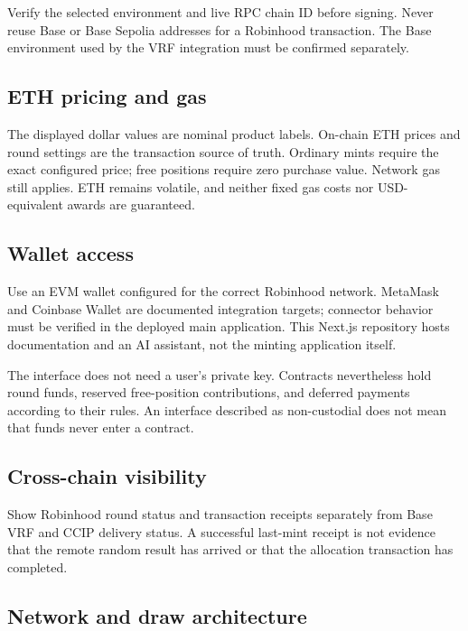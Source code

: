 \documentclass[
  10pt,
  letterpaper,
]{article}
\begin{document}
Verify the selected environment and live RPC chain ID before signing.
Never reuse Base or Base Sepolia addresses for a Robinhood transaction.
The Base environment used by the VRF integration must be confirmed
separately.

\subsection{ETH pricing and gas}\label{eth-pricing-and-gas}

The displayed dollar values are nominal product labels. On-chain ETH
prices and round settings are the transaction source of truth. Ordinary
mints require the exact configured price; free positions require zero
purchase value. Network gas still applies. ETH remains volatile, and
neither fixed gas costs nor USD-equivalent awards are guaranteed.

\subsection{Wallet access}\label{wallet-access}

Use an EVM wallet configured for the correct Robinhood network. MetaMask
and Coinbase Wallet are documented integration targets; connector
behavior must be verified in the deployed main application. This Next.js
repository hosts documentation and an AI assistant, not the minting
application itself.

The interface does not need a user's private key. Contracts nevertheless
hold round funds, reserved free-position contributions, and deferred
payments according to their rules. An interface described as
non-custodial does not mean that funds never enter a contract.

\subsection{Cross-chain visibility}\label{cross-chain-visibility}

Show Robinhood round status and transaction receipts separately from
Base VRF and CCIP delivery status. A successful last-mint receipt is not
evidence that the remote random result has arrived or that the
allocation transaction has completed.

\subsection{Network and draw
architecture}\label{network-and-draw-architecture}
\end{document}
